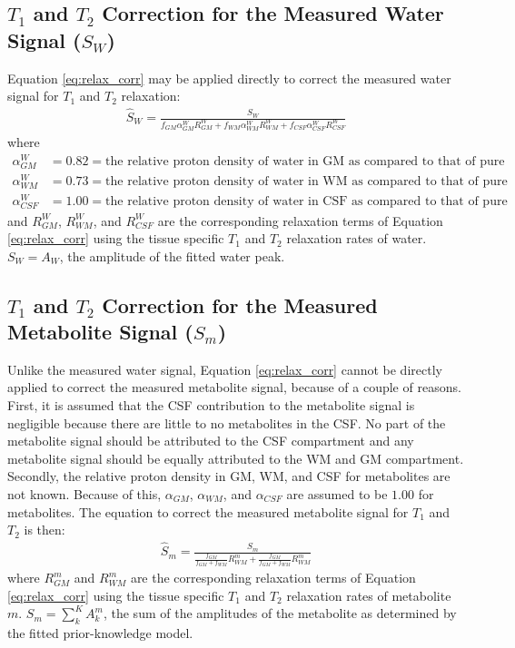 \documentclass{article}
\begin{document}
\subsection{$T_1$ and $T_2$ Correction for the Measured Water Signal ($S_W$)}
Equation \eqref{eq:relax_corr} may be applied directly to correct the measured water signal for $T_1$ and $T_2$ relaxation:
\begin{align}
	\boxed{\hat{S}_W = \frac{S_W}{f_{GM} \alpha_{GM}^{W} R_{GM}^{W} + f_{WM} \alpha_{WM}^{W} R_{WM}^{W} + f_{CSF} \alpha_{CSF}^{W}  R_{CSF}^{W}}}
	\label{eq:relax_corr_water}
\end{align}
where
\begin{align*}
	\alpha_{GM}^{W} &= 0.82 = \text{the relative proton density of water in GM as compared to that of pure water} \\
	\alpha_{WM}^{W} &= 0.73 = \text{the relative proton density of water in WM as compared to that of pure water} \\
	\alpha_{CSF}^{W} &= 1.00 = \text{the relative proton density of water in CSF as compared to that of pure water}
\end{align*}
and $R_{GM}^{W}$, $R_{WM}^{W}$, and $R_{CSF}^{W}$ are the corresponding relaxation terms of Equation \eqref{eq:relax_corr} using the tissue specific $T_1$ and $T_2$ relaxation rates of water. $\boxed{S_W = A_W}$, the amplitude of the fitted water peak.

\subsection{$T_1$ and $T_2$ Correction for the Measured Metabolite Signal ($S_m$)}
Unlike the measured water signal, Equation \eqref{eq:relax_corr} cannot be directly applied to correct the measured metabolite signal, because of a couple of reasons. First, it is assumed that the CSF contribution to the metabolite signal is negligible because there are little to no metabolites in the CSF. No part of the metabolite signal should be attributed to the CSF compartment and any metabolite signal should be equally attributed to the WM and GM compartment. Secondly, the relative proton density in GM, WM, and CSF for metabolites are not known. Because of this, $\alpha_{GM}$, $\alpha_{WM}$, and $\alpha_{CSF}$ are assumed to be $1.00$ for metabolites. The equation to correct the measured metabolite signal for $T_1$ and $T_2$ is then:
\begin{align}
	\boxed{\hat{S}_m = \frac{S_m}{\frac{f_{GM}}{f_{GM}+f_{WM}} R_{WM}^{m} + \frac{f_{GM}}{f_{GM}+f_{WM}}  R_{WM}^{m}}}
	\label{eq:relax_corr_metab}
\end{align}
where $R_{GM}^{m}$ and $R_{WM}^{m}$ are the corresponding relaxation terms of Equation \eqref{eq:relax_corr} using the tissue specific $T_1$ and $T_2$ relaxation rates of metabolite $m$. $\boxed{S_m = \sum_k^K A_k^m}$, the sum of the amplitudes of the metabolite as determined by the fitted prior-knowledge model.
\end{document}
